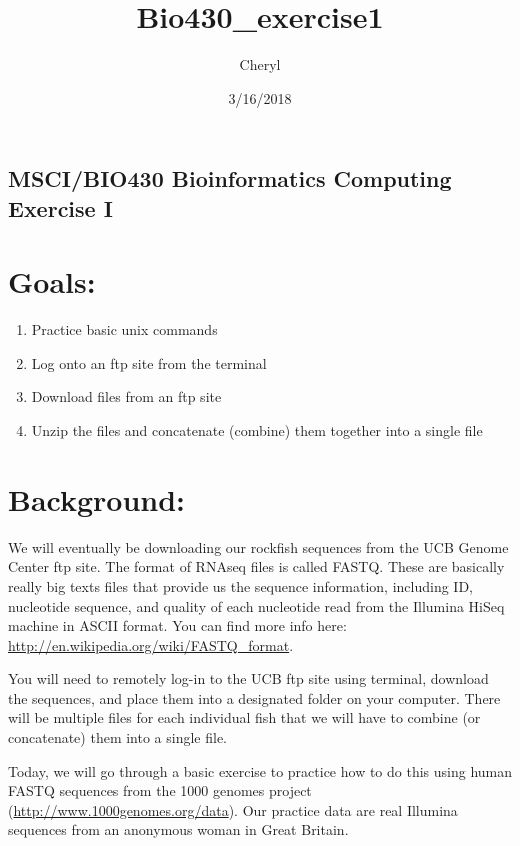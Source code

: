 \documentclass[]{article}
\title{Bio430\_exercise1}
\author{Cheryl}
\date{3/16/2018}
\providecommand{\tightlist}{%
  \setlength{\itemsep}{0pt}\setlength{\parskip}{0pt}}
\begin{document}
\maketitle

\subsection{MSCI/BIO430 Bioinformatics Computing Exercise
I}\label{mscibio430-bioinformatics-computing-exercise-i}

\section{Goals:}\label{goals}

\begin{enumerate}
\def\labelenumi{\arabic{enumi}.}
\tightlist
\item
  Practice basic unix commands
\item
  Log onto an ftp site from the terminal
\item
  Download files from an ftp site
\item
  Unzip the files and concatenate (combine) them together into a single
  file
\end{enumerate}

\section{Background:}\label{background}

We will eventually be downloading our rockfish sequences from the UCB
Genome Center ftp site. The format of RNAseq files is called FASTQ.
These are basically really big texts files that provide us the sequence
information, including ID, nucleotide sequence, and quality of each
nucleotide read from the Illumina HiSeq machine in ASCII format. You can
find more info here: \url{http://en.wikipedia.org/wiki/FASTQ_format}.

You will need to remotely log-in to the UCB ftp site using terminal,
download the sequences, and place them into a designated folder on your
computer. There will be multiple files for each individual fish that we
will have to combine (or concatenate) them into a single file.

Today, we will go through a basic exercise to practice how to do this
using human FASTQ sequences from the 1000 genomes project
(\url{http://www.1000genomes.org/data}). Our practice data are real
Illumina sequences from an anonymous woman in Great Britain.
\end{document}
